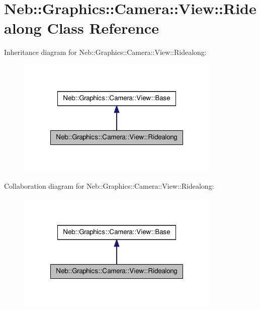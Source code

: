 \hypertarget{classNeb_1_1Graphics_1_1Camera_1_1View_1_1Ridealong}{\section{\-Neb\-:\-:\-Graphics\-:\-:\-Camera\-:\-:\-View\-:\-:\-Ridealong \-Class \-Reference}
\label{classNeb_1_1Graphics_1_1Camera_1_1View_1_1Ridealong}
}


\-Inheritance diagram for \-Neb\-:\-:\-Graphics\-:\-:\-Camera\-:\-:\-View\-:\-:\-Ridealong\-:\nopagebreak
\begin{figure}[H]
\begin{center}
\leavevmode
\includegraphics[width=276pt]{classNeb_1_1Graphics_1_1Camera_1_1View_1_1Ridealong__inherit__graph}
\end{center}
\end{figure}


\-Collaboration diagram for \-Neb\-:\-:\-Graphics\-:\-:\-Camera\-:\-:\-View\-:\-:\-Ridealong\-:\nopagebreak
\begin{figure}[H]
\begin{center}
\leavevmode
\includegraphics[width=276pt]{classNeb_1_1Graphics_1_1Camera_1_1View_1_1Ridealong__coll__graph}
\end{center}
\end{figure}
